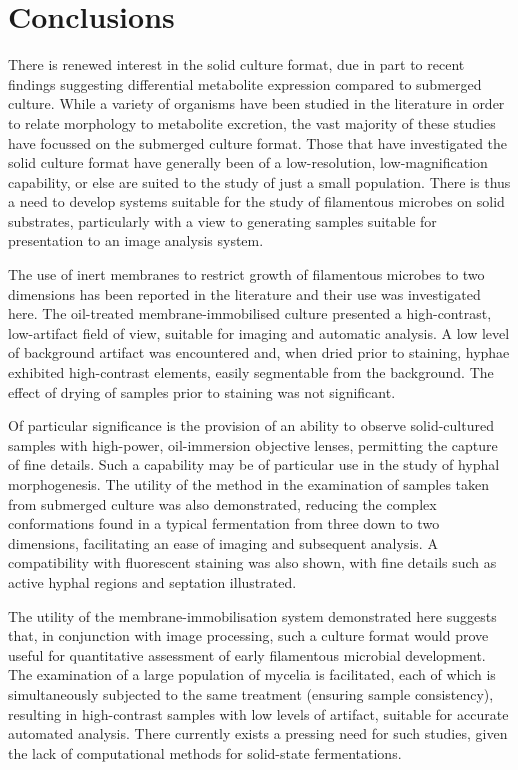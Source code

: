 \section{Conclusions}

There is renewed interest in the solid culture format, due in part to recent findings suggesting differential metabolite expression compared to submerged culture. While a variety of organisms have been studied in the literature in order to relate morphology to metabolite excretion, the vast majority of these studies have focussed on the submerged culture format. Those that have investigated the solid culture format have generally been of a low-resolution, low-magnification capability, or else are suited to the study of just a small population. There is thus a need to develop systems suitable for the study of filamentous microbes on solid substrates, particularly with a view to generating samples suitable for presentation to an image analysis system.

The use of inert membranes to restrict growth of filamentous microbes to two dimensions has been reported in the literature and their use was investigated here. The oil-treated membrane-immobilised culture presented a high-contrast, low-artifact field of view, suitable for imaging and automatic analysis. A low level of background artifact was encountered and, when dried prior to staining, hyphae exhibited high-contrast elements, easily segmentable from the background. The effect of drying of samples prior to staining was not significant.

Of particular significance is the provision of an ability to observe solid-cultured samples with high-power, oil-immersion objective lenses, permitting the capture of fine details. Such a capability may be of particular use in the study of hyphal morphogenesis. The utility of the method in the examination of samples taken from submerged culture was also demonstrated, reducing the complex conformations found in a typical fermentation from three down to two dimensions, facilitating an ease of imaging and subsequent analysis. A compatibility with fluorescent staining was also shown, with fine details such as active hyphal regions and septation illustrated.

The utility of the membrane-immobilisation system demonstrated here suggests that, in conjunction with image processing, such a culture format would prove useful for quantitative assessment of early filamentous microbial development. The examination of a large population of mycelia is facilitated, each of which is simultaneously subjected to the same treatment (ensuring sample consistency), resulting in high-contrast samples with low levels of artifact, suitable for accurate automated analysis. There currently exists a pressing need for such studies, given the lack of computational methods for solid-state fermentations.